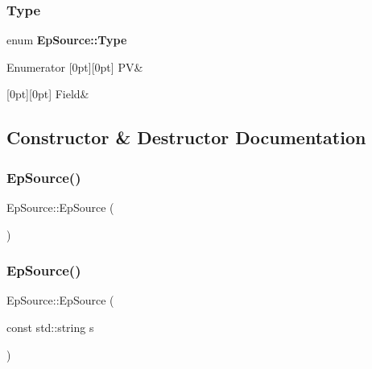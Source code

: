 \subsubsection{Type}
{\footnotesize\ttfamily enum \textbf{ Ep\+Source\+::\+Type}}

\begin{DoxyEnumFields}{Enumerator}
[0pt][0pt]{}\mbox{\label{classEpSource_a85c6c6f7a918fdf85359a347cfe209a5a7e382531e760b9ec5d2499b02d45b0e6}} 
PV&\\
\hline

[0pt][0pt]{}\mbox{\label{classEpSource_a85c6c6f7a918fdf85359a347cfe209a5a090e1c9f51b93f2bf5b62d93ebffbd0c}} 
Field&\\
\hline

\end{DoxyEnumFields}


\subsection{Constructor \& Destructor Documentation}
\mbox{\label{classEpSource_a085dc13a32d55cba76a96155c4c57207}} 
\subsubsection{Ep\+Source()\hspace{0.1cm}{\footnotesize\ttfamily [1/3]}}
{\footnotesize\ttfamily Ep\+Source\+::\+Ep\+Source (\begin{DoxyParamCaption}{ }\end{DoxyParamCaption})}

\mbox{\label{classEpSource_a0e907f68fb4a7a20ed11112a5b74277f}} 
\subsubsection{Ep\+Source()\hspace{0.1cm}{\footnotesize\ttfamily [2/3]}}
{\footnotesize\ttfamily Ep\+Source\+::\+Ep\+Source (\begin{DoxyParamCaption}\item[{const std\+::string}]{s }\end{DoxyParamCaption})}

